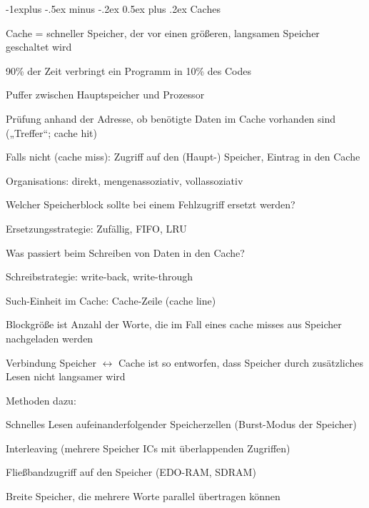 \documentclass[10pt,landscape]{article}
\makeatletter
\renewcommand{\subsection}{\@startsection{subsection}{2}{0mm}%
                                {-1explus -.5ex minus -.2ex}%
                                {0.5ex plus .2ex}%
                                {\normalfont\normalsize\bfseries}}
\makeatother
\begin{document}
\begin{multicols}{3}
  \subsection{Caches}
  \begin{itemize*}
    \item Cache = schneller Speicher, der vor einen größeren, langsamen Speicher geschaltet wird
    \item 90\% der Zeit verbringt ein Programm in 10\% des Codes
    \item Puffer zwischen Hauptspeicher und Prozessor
    \item Prüfung anhand der Adresse, ob benötigte Daten im Cache vorhanden sind („Treffer“; cache hit)
    \item Falls nicht (cache miss): Zugriff auf den (Haupt-) Speicher, Eintrag in den Cache
    \item Organisations: direkt, mengenassoziativ, vollassoziativ
    \item Welcher Speicherblock sollte bei einem Fehlzugriff ersetzt werden?
    \item Ersetzungsstrategie: Zufällig, FIFO, LRU
    \item Was passiert beim Schreiben von Daten in den Cache?
    \item Schreibstrategie: write-back, write-through
    \item Such-Einheit im Cache: Cache-Zeile (cache line)
    \item Blockgröße ist Anzahl der Worte, die im Fall eines cache misses aus Speicher nachgeladen werden
    \item Verbindung Speicher $\leftrightarrow$ Cache ist so entworfen, dass Speicher durch zusätzliches Lesen nicht langsamer wird
    \item Methoden dazu:
    \begin{itemize*}
      \item Schnelles Lesen aufeinanderfolgender Speicherzellen (Burst-Modus der Speicher)
      \item Interleaving (mehrere Speicher ICs mit überlappenden Zugriffen)
      \item Fließbandzugriff auf den Speicher (EDO-RAM, SDRAM)
      \item Breite Speicher, die mehrere Worte parallel übertragen können
    \end{itemize*}

\end{itemize*}
\end{multicols}
\end{document}
